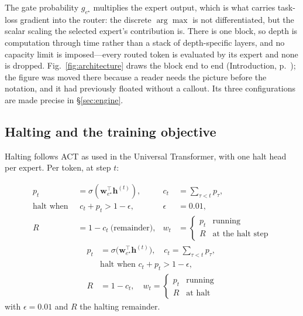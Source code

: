 The gate probability $g_{e^\star}$ multiplies the expert output, which is what
carries task-loss gradient into the router: the discrete $\arg\max$ is not
differentiated, but the scalar scaling the selected expert's contribution is.
There is one block, so depth is computation through time rather than a stack of
depth-specific layers, and no capacity limit is imposed---every routed token is
evaluated by its expert and none is dropped. Fig.~\ref{fig:architecture} draws
the block end to end (Introduction, p.~\pageref{fig:architecture}); the figure
was moved there because a reader needs the picture before the notation, and it
had previously floated without a callout. Its three configurations are made
precise in \S\ref{sec:engine}.

\subsection{Halting and the training objective}
\label{sec:halting-method}

Halting follows ACT \citep{graves2016act} as used in the Universal Transformer,
with one halt head per expert. Per token, at step $t$:

{\dispsize
\begin{align}
p_t &= \sigma\!\left(\mathbf{w}_{e^\star}^{\!\top}\mathbf{h}^{(t)}\right),
  & c_t &= \sum_{\tau < t} p_\tau ,
  \label{eq:halt-p} \\[2pt]
\text{halt when } &\; c_t + p_t > 1 - \epsilon, & \epsilon &= 0.01,
  \label{eq:halt-cond} \\[2pt]
R &= 1 - c_t \ \text{(remainder)}, &
  w_t &= \begin{cases} p_t & \text{running} \\ R & \text{at the halt step}\end{cases}
  \label{eq:halt-w}
\end{align}
}
{\dispsize
\begin{align}
p_t &= \sigma\big(\mathbf{w}_{e^\star}^{\!\top}\mathbf{h}^{(t)}\big),
  \quad c_t = \textstyle\sum_{\tau < t} p_\tau , \label{eq:halt-p} \\[2pt]
&\text{halt when } c_t + p_t > 1 - \epsilon , \label{eq:halt-cond} \\[2pt]
R &= 1 - c_t , \quad
  w_t = \begin{cases} p_t & \text{running} \\ R & \text{at halt} \end{cases}
  \label{eq:halt-w}
\end{align}
}
with $\epsilon = 0.01$ and $R$ the halting remainder.

